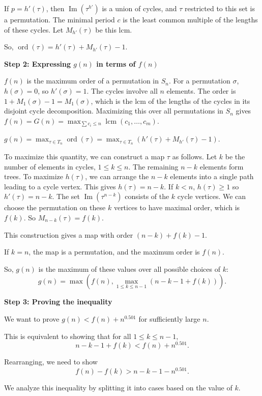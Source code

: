 \documentclass[12pt,a4paper]{article}
\theoremstyle{definition}
\begin{document}
    If $p=h'(\tau)$, then $\operatorname{Im}(\tau^{h'})$ is a union of cycles, and $\tau$ restricted to this set is a permutation. The minimal period $c$ is the least common multiple of the lengths of these cycles. Let $M_{h'}(\tau)$ be this lcm.

    So, $\operatorname{ord}(\tau) = h'(\tau) + M_{h'}(\tau) - 1$.

    \textbf{Step 2: Expressing $g(n)$ in terms of $f(n)$}

    $f(n)$ is the maximum order of a permutation in $S_n$. For a permutation $\sigma$, $h(\sigma)=0$, so $h'(\sigma)=1$. The cycles involve all $n$ elements. The order is $1 + M_1(\sigma) - 1 = M_1(\sigma)$, which is the lcm of the lengths of the cycles in its disjoint cycle decomposition. Maximizing this over all permutations in $S_n$ gives $f(n) = G(n) = \max_{\sum c_i \leq n} \operatorname{lcm}(c_1, \ldots, c_m)$.

    $g(n) = \max_{\tau \in T_n} \operatorname{ord}(\tau) = \max_{\tau \in T_n} (h'(\tau) + M_{h'}(\tau) - 1)$.

    To maximize this quantity, we can construct a map $\tau$ as follows. Let $k$ be the number of elements in cycles, $1 \leq k \leq n$. The remaining $n-k$ elements form trees. To maximize $h(\tau)$, we can arrange the $n-k$ elements into a single path leading to a cycle vertex. This gives $h(\tau) = n-k$. If $k<n$, $h(\tau) \geq 1$ so $h'(\tau)=n-k$. The set $\operatorname{Im}(\tau^{n-k})$ consists of the $k$ cycle vertices. We can choose the permutation on these $k$ vertices to have maximal order, which is $f(k)$. So $M_{n-k}(\tau)=f(k)$.

    This construction gives a map with order $(n-k) + f(k) - 1$.

    If $k=n$, the map is a permutation, and the maximum order is $f(n)$.

    So, $g(n)$ is the maximum of these values over all possible choices of $k$:
    \[ g(n) = \max\left(f(n), \max_{1 \leq k \leq n-1} (n-k-1+f(k))\right). \]

    \textbf{Step 3: Proving the inequality}

    We want to prove $g(n) < f(n) + n^{0.501}$ for sufficiently large $n$.

    This is equivalent to showing that for all $1 \leq k \leq n-1$,
    \[ n-k-1+f(k) < f(n) + n^{0.501}. \]

    Rearranging, we need to show
    \[ f(n) - f(k) > n-k-1-n^{0.501}. \]

    We analyze this inequality by splitting it into cases based on the value of $k$.
\end{document}
